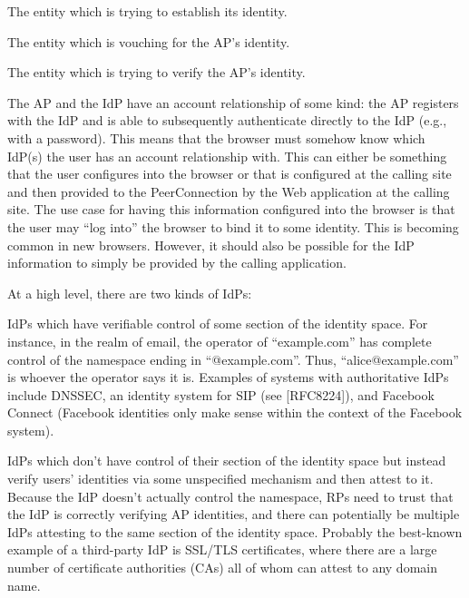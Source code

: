 \documentclass{article}
\begin{document}
\begin{description}[style=nextline]
\item[Authenticating Party (AP):] The entity which is trying to establish
  its identity.

\item[Identity Provider (IdP):] The entity which is vouching for the AP's
  identity.

\item[Relying Party (RP):] The entity which is trying to verify the AP's
  identity.
\end{description}

The AP and the IdP have an account relationship of some kind: the AP
registers with the IdP and is able to subsequently authenticate
directly to the IdP (e.g., with a password).  This means that the
browser must somehow know which IdP(s) the user has an account
relationship with.  This can either be something that the user
configures into the browser or that is configured at the calling site
and then provided to the PeerConnection by the Web application at the
calling site.  The use case for having this information configured
into the browser is that the user may ``log into'' the browser to bind
it to some identity.  This is becoming common in new browsers.
However, it should also be possible for the IdP information to simply
be provided by the calling application.

At a high level, there are two kinds of IdPs:

\begin{description}[style=nextline]
\item[Authoritative:] IdPs which have verifiable control of some section of
  the identity space.  For instance, in the realm of email, the
  operator of ``example.com'' has complete control of the namespace
  ending in ``@example.com''.  Thus, ``alice@example.com'' is whoever
  the operator says it is.  Examples of systems with authoritative
  IdPs include DNSSEC, an identity system for SIP (see [RFC8224]),
  and Facebook Connect (Facebook identities only make sense within
  the context of the Facebook system).

\item[Third-Party:] IdPs which don't have control of their section of the
  identity space but instead verify users' identities via some
  unspecified mechanism and then attest to it.  Because the IdP
  doesn't actually control the namespace, RPs need to trust that the
  IdP is correctly verifying AP identities, and there can
  potentially be multiple IdPs attesting to the same section of the
  identity space.  Probably the best-known example of a third-party
  IdP is SSL/TLS certificates, where there are a large number of
  certificate authorities (CAs) all of whom can attest to any domain
  name.
\end{description}
\end{document}
